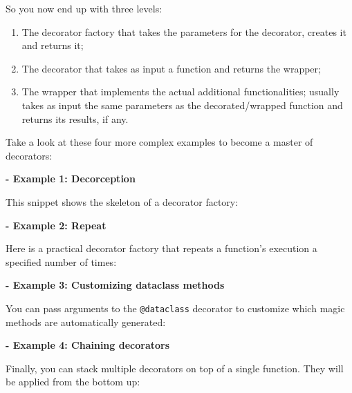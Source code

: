 So you now end up with three levels:
\begin{enumerate}
    \item The decorator factory that takes the parameters for the decorator, creates it and returns it;
    \item The decorator that takes as input a function and returns the wrapper;
    \item The wrapper that implements the actual additional functionalities; usually takes as input the same parameters as the decorated/wrapped function and returns its results, if any.
\end{enumerate}
Take a look at these four more complex examples to become a master of decorators:

\textbf{- Example 1: Decorception}

This snippet shows the skeleton of a decorator factory:


\textbf{- Example 2: Repeat}

Here is a practical decorator factory that repeats a function's execution a specified number of times:


\textbf{- Example 3: Customizing dataclass methods}

You can pass arguments to the \texttt{@dataclass} decorator to customize which magic methods are automatically generated:


\textbf{- Example 4: Chaining decorators}

Finally, you can stack multiple decorators on top of a single function. They will be applied from the bottom up:
